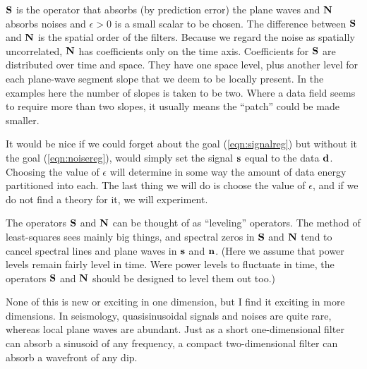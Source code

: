 $\bold S $ is the operator that absorbs (by prediction error)
the plane waves and $\bold N$ absorbs noises
and $\epsilon > 0$ is a small scalar to be chosen.
The difference between $\bold S$ and $\bold N$
is the spatial order of the filters.
Because we regard the noise as spatially uncorrelated,
$\bold N$ has coefficients only on the time axis.
Coefficients for $\bold S$
are distributed over time and space.
They have one space level,
plus another level
for each plane-wave segment slope that
we deem to be locally present.
In the examples here the number of slopes is taken to be two.
Where a data field seems to require more than two slopes,
it usually means the ``patch'' could be made smaller.
\par
It would be nice if we could forget about the goal
(\ref{eqn:signalreg})
but without it the goal
(\ref{eqn:noisereg}),
would simply set the signal $\bold s$
equal to the data $\bold d$.
Choosing the value of $\epsilon$ 
will determine in some way the amount of data energy partitioned into each.
The last thing we will do is choose the value of $\epsilon$,
and if we do not find a theory for it, we will experiment.

\par
The operators $\bold S $ and $\bold N$
can be thought of as ``leveling'' operators.
The method of least-squares sees mainly big things,
and spectral zeros in $\bold S $ and $\bold N$
tend to cancel
spectral lines and plane waves in $\bold s$ and $\bold n$.
(Here we assume that power levels remain fairly level in time.
Were power levels to fluctuate in time,
the operators $\bold S $ and $\bold N$
should be designed to level them out too.)

\par
None of this is new or exciting in one dimension,
but I find it exciting in more dimensions.
In seismology,
quasisinusoidal signals and noises are quite rare,
whereas local plane waves are abundant.
Just as
a short one-dimensional filter can absorb a sinusoid of any frequency,
a compact two-dimensional filter can absorb a wavefront of any dip.

